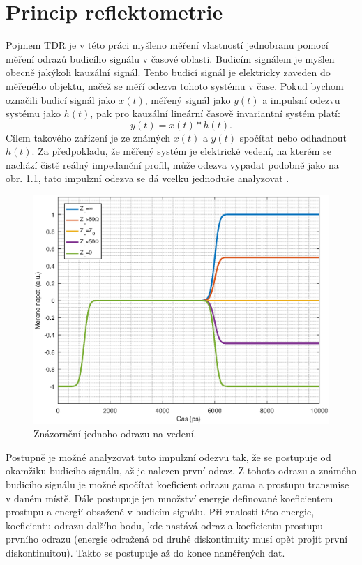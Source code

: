 \chapter{Princip reflektometrie}

Pojmem \acrfull{TDR} je v této práci myšleno měření vlastností jednobranu pomocí měření odrazů budicího signálu v časové oblasti. Budicím signálem je myšlen obecně jakýkoli kauzální signál. Tento budicí signál je elektricky zaveden do měřeného objektu, načež se měří odezva tohoto systému v čase.
Pokud bychom označili budicí signál jako $x(t)$, měřený signál jako $y(t)$ a impulsní odezvu systému jako $h(t)$, pak pro kauzální lineární časově invariantní systém platí:
\begin{equation}
y(t)=x(t) \ast h(t).
\end{equation}
Cílem takového zařízení je ze známých $x(t)$ a $y(t)$ spočítat nebo odhadnout $h(t)$. Za předpokladu, že měřený systém je elektrické vedení, na kterém se nachází čistě reálný impedanční profil, může odezva vypadat podobně jako na obr. \ref{simpleresponse}, tato impulzní odezva se dá vcelku jednoduše analyzovat \cite{broadbandreflectometry}.

\begin{figure}[htbp]\includegraphics[width=\textwidth,keepaspectratio]{images/onereflectionsample.eps}\caption{Znázornění jednoho odrazu na vedení.}\label{simpleresponse}\end{figure}

Postupně je možné analyzovat tuto impulzní odezvu tak, že se postupuje od okamžiku budicího signálu, až je nalezen první odraz. Z tohoto odrazu a známého budicího signálu je možné spočítat koeficient odrazu \gls{gama} a prostupu \gls{transmise} v daném místě. Dále postupuje jen množství energie definované koeficientem prostupu a energií obsažené v budicím signálu. Při znalosti této energie, koeficientu odrazu dalšího bodu, kde nastává odraz a koeficientu prostupu prvního odrazu (energie odražená od druhé diskontinuity musí opět projít první diskontinuitou). Takto se postupuje až do konce naměřených dat.


